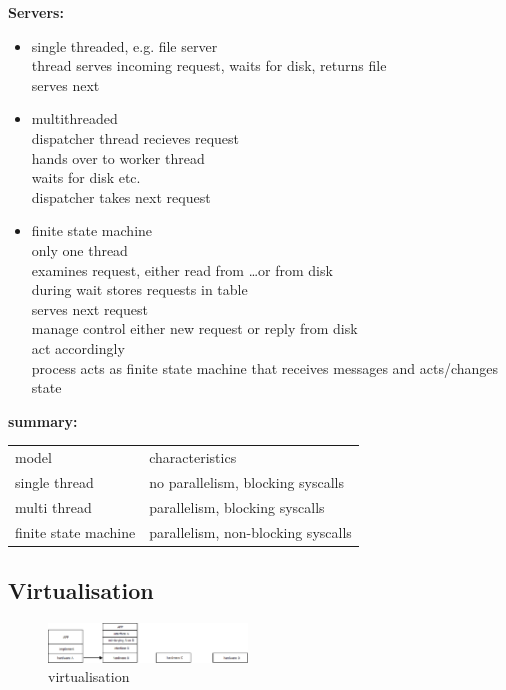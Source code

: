 \documentclass[ngerman,a4paper]{report}
\begin{document}
\textbf{Servers:}\\
\begin{itemize}
\item single threaded, e.g. file server\\
thread serves incoming request, waits for disk, returns file\\
serves next
\item multithreaded\\
dispatcher thread recieves request\\
hands over to worker thread\\
waits for disk etc.\\
dispatcher takes next request
\item finite state machine\\
only one thread\\
examines request, either read from \ldots or from disk\\
during wait stores requests in table\\
serves next request\\
manage control either new request or reply from disk\\
act accordingly\\
process acts as finite state machine that receives messages and acts/changes state
\end{itemize}

\textbf{summary:}\\
\begin{tabular}{l l}
model&characteristics\\
single thread& no parallelism, blocking syscalls\\
multi thread& parallelism, blocking syscalls\\
finite state machine& parallelism, non-blocking syscalls\\
\end{tabular}

\subsection{Virtualisation}
\begin{figure}[h]
	\centering
	\includegraphics[width=200px]{gfx/virtualisation_1.png}
	\caption{virtualisation}
	\label{img:virtualisation_1}
\end{figure}
\end{document}
